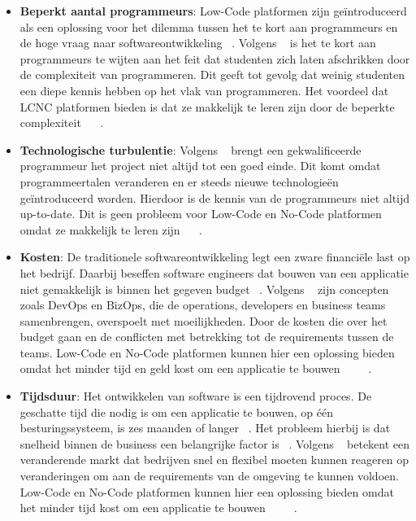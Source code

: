 \begin{itemize}
    \item \textbf{Beperkt aantal programmeurs}: 
    Low-Code platformen zijn geïntroduceerd als een oplossing voor het dilemma tussen het te kort aan programmeurs en de hoge vraag naar softwareontwikkeling ~\autocite{ALSAADI_2021}. Volgens 
    ~\textcite{Moskal_2021} is het te kort aan programmeurs te wijten aan het feit dat studenten zich laten afschrikken door de complexiteit van programmeren. Dit geeft tot gevolg dat weinig 
    studenten een diepe kennis hebben op het vlak van programmeren. Het voordeel dat LCNC platformen bieden is dat ze makkelijk te leren zijn door de beperkte complexiteit ~\autocite{ALSAADI_2021} ~\autocite{Sufi_2023}.
    \item \textbf{Technologische turbulentie}:
    Volgens ~\textcite{Moskal_2021} brengt een gekwalificeerde programmeur het project niet altijd tot een goed einde.
    Dit komt omdat programmeertalen veranderen en er steeds nieuwe technologieën geïntroduceerd worden. Hierdoor is de kennis van de programmeurs niet altijd up-to-date.
    Dit is geen probleem voor Low-Code en No-Code platformen omdat ze makkelijk te leren zijn ~\autocite{ALSAADI_2021} ~\autocite{Sufi_2023}.
    \item \textbf{Kosten}:
    De traditionele softwareontwikkeling legt een zware financiële last op het bedrijf. 
    Daarbij beseffen software engineers dat bouwen van een applicatie niet gemakkelijk is binnen het gegeven budget ~\autocite{Moskal_2021}. 
    Volgens ~\textcite{Elshan2023} zijn concepten zoals DevOps en BizOps, die de operations, developers en business teams samenbrengen, overspoelt met moeilijkheden. 
    Door de kosten die over het budget gaan en de conflicten met betrekking tot de requirements tussen de teams.
    Low-Code en No-Code platformen kunnen hier een oplossing bieden omdat het minder tijd en geld kost om een applicatie te bouwen ~\autocite{Elshan2023} ~\autocite{Bock_2021} ~\autocite{Rokis_2023}.
    \item \textbf{Tijdsduur}:
    Het ontwikkelen van software is een tijdrovend proces. De geschatte tijd die nodig is om een applicatie te bouwen, op één besturingssysteem, is zes maanden of langer ~\autocite{Moskal_2021}. 
    Het probleem hierbij is dat snelheid binnen de business een belangrijke factor is ~\autocite{Sanchis_2019}. 
    Volgens ~\textcite{Sanchis_2019} betekent een veranderende markt dat bedrijven snel en flexibel moeten kunnen reageren op veranderingen om aan de requirements van de omgeving te kunnen voldoen.
    Low-Code en No-Code platformen kunnen hier een oplossing bieden omdat het minder tijd kost om een applicatie te bouwen ~\autocite{Adrian_2020} ~\autocite{Bock_2021} ~\autocite{Rokis_2023}.


\end{itemize}
